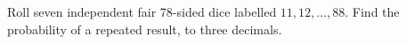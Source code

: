 Roll seven independent fair 78-sided dice labelled $11,12,\ldots,88$. Find the probability of a repeated result, to three decimals.
